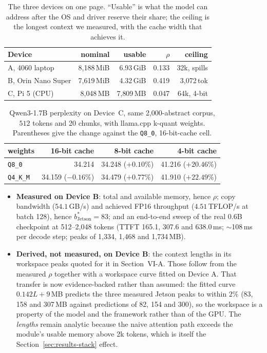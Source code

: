 \documentclass[10pt,journal]{IEEEtran}
\newcommand{\rhoSym}{\rho}
\begin{document}
\begin{table}[t]
\caption{The three devices on one page. ``Usable'' is what the model can address
after the OS and driver reserve their share; the ceiling is the longest context we
measured, with the cache width that achieves it.}
\label{tab:devices}
\begin{tabular}{@{}lrrrr@{}}
\toprule
Device & nominal & usable & $\rhoSym$ & ceiling \\
\midrule
A, 4060 laptop & 8{,}188\,MiB & 6.93\,GiB & 0.133 & 32k, spills \\
B, Orin Nano Super & 7{,}619\,MiB & 4.32\,GiB & 0.419 & 3{,}072\,tok \\
C, Pi 5 (CPU) & 8{,}048\,MB & 7{,}809\,MB & 0.047 & 64k, 4-bit \\
\bottomrule
\end{tabular}
\end{table}

\begin{table}[t]
\caption{Qwen3-1.7B perplexity on Device~C, same 2{,}000-abstract corpus, $512$
tokens and 20 chunks, with llama.cpp k-quant weights. Parentheses give the change
against the \texttt{Q8\_0}, 16-bit-cache cell.}
\label{tab:pi-accuracy}
\begin{tabular}{@{}lrrr@{}}
\toprule
weights & 16-bit cache & 8-bit cache & 4-bit cache \\
\midrule
\texttt{Q8\_0} & 34.214 & 34.248 ($+0.10\%$) & 41.216 ($+20.46\%$) \\
\texttt{Q4\_K\_M} & 34.159 ($-0.16\%$) & 34.479 ($+0.77\%$) & 41.910 ($+22.49\%$) \\
\bottomrule
\end{tabular}
\end{table}

\begin{itemize}
\item \textbf{Measured on Device B}: total and available memory, hence
      $\rhoSym$; copy bandwidth ($54.1$\,GB/s) and achieved FP16 throughput
      ($4.51$\,TFLOP/s at batch 128), hence $b^*_{\mathrm{Jetson}}{=}83$; and an
      end-to-end sweep of the real 0.6B checkpoint at 512--2{,}048 tokens
      (TTFT 165.1, 307.6 and 638.0\,ms; $\sim$108\,ms per decode step; peaks of
      1{,}334, 1{,}468 and 1{,}734\,MB).
\item \textbf{Derived, not measured, on Device B}: the context lengths in its
      workspace peaks quoted for it in Section~VI-A. Those follow from the measured $\rhoSym$
      together with a workspace curve fitted on Device A. That transfer is now
      evidence-backed rather than assumed: the fitted curve $0.142L+9$\,MB
      predicts the three measured Jetson peaks to within $2\%$ (83, 158 and
      307\,MB against predictions of 82, 154 and 300), so the workspace is a
      property of the model and the framework rather than of the GPU. The
      \emph{lengths} remain analytic because the naive attention path exceeds
      the module's usable memory above 2k tokens, which is itself the
      Section~\ref{sec:results-stack} effect.
\end{itemize}
\end{document}
